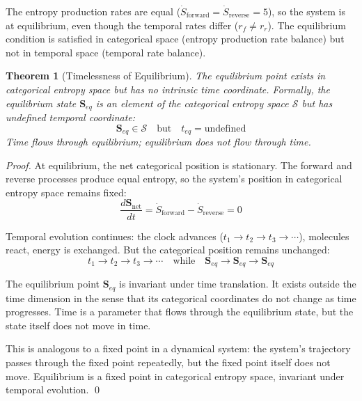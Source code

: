 \documentclass[12pt,a4paper]{article}
\newtheorem{theorem}{Theorem}[section]
\theoremstyle{definition}
\theoremstyle{remark}
\begin{document}
The entropy production rates are equal ($\dot{S}_{\text{forward}} = \dot{S}_{\text{reverse}} = 5$), so the system is at equilibrium, even though the temporal rates differ ($r_f \neq r_r$). The equilibrium condition is satisfied in categorical space (entropy production rate balance) but not in temporal space (temporal rate balance).

\begin{theorem}[Timelessness of Equilibrium]
\label{thm:timeless_equilibrium}
The equilibrium point exists in categorical entropy space but has no intrinsic time coordinate. Formally, the equilibrium state $\mathbf{S}_{eq}$ is an element of the categorical entropy space $\mathcal{S}$ but has undefined temporal coordinate:
\begin{equation}
\mathbf{S}_{eq} \in \mathcal{S} \quad \text{but} \quad t_{eq} = \text{undefined}
\label{eq:timeless_equilibrium}
\end{equation}
Time flows through equilibrium; equilibrium does not flow through time.
\end{theorem}

\begin{proof}
At equilibrium, the net categorical position is stationary. The forward and reverse processes produce equal entropy, so the system's position in categorical entropy space remains fixed:
\begin{equation}
\frac{d\mathbf{S}_{\text{net}}}{dt} = \dot{S}_{\text{forward}} - \dot{S}_{\text{reverse}} = 0
\end{equation}

Temporal evolution continues: the clock advances ($t_1 \to t_2 \to t_3 \to \cdots$), molecules react, energy is exchanged. But the categorical position remains unchanged:
\begin{equation}
t_1 \to t_2 \to t_3 \to \cdots \quad \text{while} \quad \mathbf{S}_{eq} \to \mathbf{S}_{eq} \to \mathbf{S}_{eq}
\end{equation}

The equilibrium point $\mathbf{S}_{eq}$ is invariant under time translation. It exists outside the time dimension in the sense that its categorical coordinates do not change as time progresses. Time is a parameter that flows through the equilibrium state, but the state itself does not move in time.

This is analogous to a fixed point in a dynamical system: the system's trajectory passes through the fixed point repeatedly, but the fixed point itself does not move. Equilibrium is a fixed point in categorical entropy space, invariant under temporal evolution. \qed
\end{proof}
\end{document}
